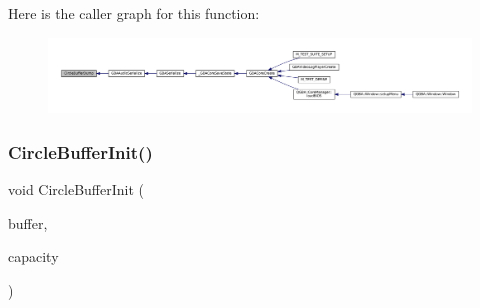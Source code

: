 Here is the caller graph for this function\+:
\nopagebreak
\begin{figure}[H]
\begin{center}
\leavevmode
\includegraphics[width=350pt]{circle-buffer_8c_a13bf863d3a10d3b22cffbe60c1706c33_icgraph}
\end{center}
\end{figure}
\mbox{\label{circle-buffer_8c_afaa8d0d895fcf4ce976a956ef6cc97bb}} 
\subsubsection{\texorpdfstring{Circle\+Buffer\+Init()}{CircleBufferInit()}}
{\footnotesize\ttfamily void Circle\+Buffer\+Init (\begin{DoxyParamCaption}\item[{struct Circle\+Buffer $\ast$}]{buffer,  }\item[{unsigned}]{capacity }\end{DoxyParamCaption})}

